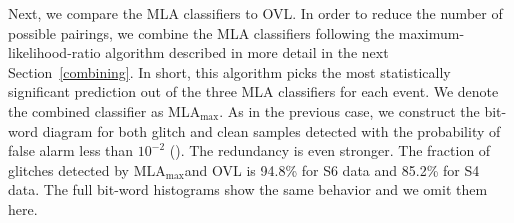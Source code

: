 \documentclass[prd, twocolumn, lengthcheck, superscriptaddress, showpacs, letterpaper, nofootinbib]{revtex4-1}
\newcommand\MLAmax{\ac{MLA}${}_{\mathrm{max}}$}
\begin{document}


Next, we compare the \ac{MLA} classifiers to \ac{OVL}. In order to reduce the number of possible pairings, we combine the \ac{MLA} classifiers following the maximum-likelihood-ratio algorithm described in more detail in the next Section~\ref{combining}. In short, this algorithm picks the most statistically significant prediction out of the three \ac{MLA} classifiers for each event. We denote the combined classifier as \MLAmax. As in the previous case, we construct the bit-word diagram for both glitch and clean samples detected with the probability of false alarm less than $10^{-2}$ (). The redundancy is even stronger. The fraction of glitches detected by \MLAmax and \ac{OVL} is 94.8\% for S6 data and  85.2\% for S4 data. The full bit-word histograms show the same behavior and we omit them here.
\end{document}
